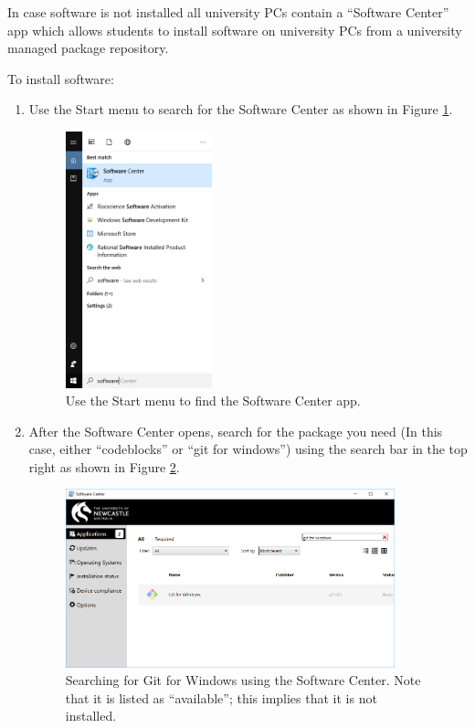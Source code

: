 \documentclass{lab}
\begin{document}
In case software is not installed all university PCs contain a ``Software Center'' app which allows students to install software on university PCs from a university managed package repository.

To install software:

\begin{enumerate}
\item Use the Start menu to search for the Software Center as shown in Figure \ref{fig:SoftwareCenter}.

\begin{figure}[H]
\begin{center}
\includegraphics[width=0.4\textwidth]{Wk1Images/softwareSearch.png}
\end{center}
\caption{Use the Start menu to find the Software Center app.}
\label{fig:SoftwareCenter}
\end{figure}

\item After the Software Center opens, search for the package you need (In this case, either ``codeblocks'' or ``git for windows'') using the search bar in the top right as shown in Figure \ref{fig:SoftwareCenterGit}.

\begin{figure}[H]
\begin{center}
\includegraphics[width=0.9\textwidth]{Wk1Images/softwareSearchGit.PNG}
\end{center}
\caption{Searching for Git for Windows using the Software Center. Note that it is listed as ``available''; this implies that it is not installed.}
\label{fig:SoftwareCenterGit}
\end{figure}


\end{enumerate}
\end{document}

